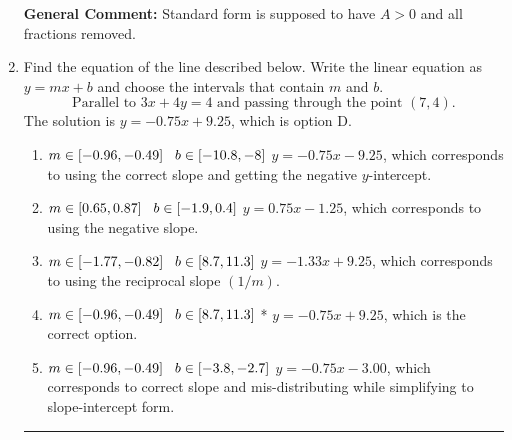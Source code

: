 \documentclass{extbook}[14pt]
\newcommand{\litem}[1]{\item #1

\rule{\textwidth}{0.4pt}}
\begin{document}
\begin{enumerate}
{\textbf{General Comment:} Standard form is supposed to have $A > 0$ and all fractions removed.
}
\litem{
Find the equation of the line described below. Write the linear equation as $ y=mx+b $ and choose the intervals that contain $m$ and $b$.
\[ \text{Parallel to } 3 x + 4 y = 4 \text{ and passing through the point } (7, 4). \]
The solution is \( y = -0.75x + 9.25 \), which is option D.\begin{enumerate}[label=\Alph*.]
\item \( m \in [-0.96, -0.49] \hspace*{3mm} b \in [-10.8, -8] \)
 $y = -0.75x - 9.25$, which corresponds to using the correct slope and getting the negative $y$-intercept.
\item \( m \in [0.65, 0.87] \hspace*{3mm} b \in [-1.9, 0.4] \)
 $y = 0.75x - 1.25$, which corresponds to using the negative slope.
\item \( m \in [-1.77, -0.82] \hspace*{3mm} b \in [8.7, 11.3] \)
 $y = -1.33x + 9.25$, which corresponds to using the reciprocal slope $(1/m)$.
\item \( m \in [-0.96, -0.49] \hspace*{3mm} b \in [8.7, 11.3] \)
* $y = -0.75x + 9.25$, which is the correct option.
\item \( m \in [-0.96, -0.49] \hspace*{3mm} b \in [-3.8, -2.7] \)
 $y = -0.75x - 3.00$, which corresponds to correct slope and mis-distributing while simplifying to slope-intercept form.
\end{enumerate}

}
\end{enumerate}
\end{document}
